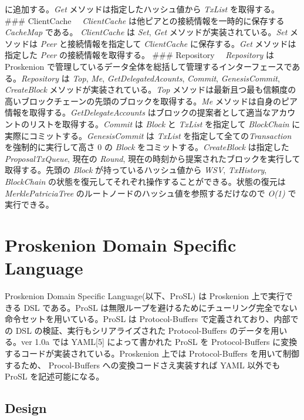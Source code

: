 に追加する。\emph{Get} メソッドは指定したハッシュ値から \emph{TxList}
を取得する。 \#\#\# ClientCache 　\emph{ClientCache}
は他ピアとの接続情報を一時的に保存する \emph{CacheMap} である。
\emph{ClientCache} は \emph{Set}, \emph{Get}
メソッドが実装されている。\emph{Set} メソッドは \emph{Peer}
と接続情報を指定して \emph{ClientCache} に保存する。\emph{Get}
メソッドは指定した \emph{Peer} の接続情報を取得する。 \#\#\# Repository
　\emph{Repository} は Proskenion
で管理しているデータ全体を総括して管理するインターフェースである。\emph{Repository}
は \emph{Top}, \emph{Me}, \emph{GetDelegatedAcounts}, \emph{Commit},
\emph{GenesisCommit}, \emph{CreateBlock}
メソッドが実装されている。\emph{Top}
メソッドは最新且つ最も信頼度の高いブロックチェーンの先頭のブロックを取得する。\emph{Me}
メソッドは自身のピア情報を取得する。\emph{GetDelegateAccounts}
はブロックの提案者として適当なアカウントのリストを取得する。\emph{Commit}
は \emph{Block} と \emph{TxList} を指定して \emph{BlockChain}
に実際にコミットする。\emph{GenesisCommit} は \emph{TxList}
を指定して全ての\emph{Transaction} を強制的に実行して高さ 0 の
\emph{Block} をコミットする。\emph{CreateBlock} は指定した
\emph{ProposalTxQueue}, 現在の \emph{Round},
現在の時刻から提案されたブロックを実行して取得する。先頭の \emph{Block}
が持っているハッシュ値から \emph{WSV}, \emph{TxHistory},
\emph{BlockChain}
の状態を復元してそれぞれ操作することができる。状態の復元は
\emph{MerklePatriciaTree} のルートノードのハッシュ値を参照するだけなので
\emph{O(1)} で実行できる。

\hypertarget{proskenion-domain-specific-language}{%
\section{Proskenion Domain Specific
Language}\label{proskenion-domain-specific-language}}

Proskenion Domain Specific Language(以下、ProSL) は Proskenion
上で実行できる DSL である。ProSL
は無限ループを避けるためにチューリング完全でない命令セットを用いている。ProSL
は Protocol-Buffers で定義されており、内部での DSL
の検証、実行もシリアライズされた Protocol-Buffers のデータを用いる。ver
1.0a では YAML{[}5{]} によって書かれた ProSL を Protocol-Buffers
に変換するコードが実装されている。Proskenion 上では Protocol-Buffers
を用いて制御するため、 Procol-Buffers への変換コードさえ実装すれば YAML
以外でも ProSL を記述可能になる。

\hypertarget{design}{%
\subsection{Design}\label{design}}

